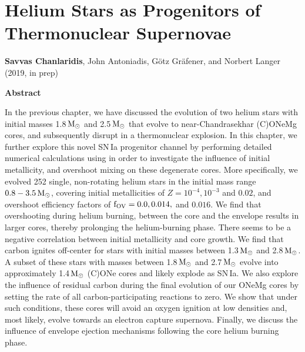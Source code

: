 \documentclass[../../main/thesis_msc.tex]{subfiles}
\begin{document}
\chapter{Helium Stars as Progenitors of Thermonuclear Supernovae}\label{ch:paperII}

\begin{center}
\textbf{Savvas Chanlaridis}, John Antoniadis, G\"otz Gr\"afener, and Norbert Langer (2019, in prep)
\newline
\end{center}


\begin{center}
\textbf{\large Abstract}
\end{center}

In the previous chapter, we have discussed the evolution of two helium stars with initial masses 1.8\,$\rm M_{\odot}$ and 2.5\,$\rm M_{\odot}$ that evolve to near-Chandrasekhar (C)ONeMg cores, and subsequently disrupt in a thermonuclear explosion. In this chapter, we further explore this novel SN\,Ia progenitor channel by performing detailed numerical calculations using \mesa in order to investigate the influence of initial metallicity, and overshoot mixing on these degenerate cores. 
More specifically, we evolved 252 single, non-rotating helium stars  in the initial mass range $\rm 0.8-3.5\, M_{\odot}$, covering initial metallicities of $Z=10^{-4},10^{-3}$ and $0.02$, and overshoot efficiency factors of $\rm f_{OV} = 0.0,0.014,$ and $0.016$. 
We find that overshooting during helium burning, between the core and the envelope results in larger cores, thereby prolonging the helium-burning phase. 
There seems to be a negative correlation between initial metallicity and core growth. We find that carbon ignites off-center for stars with initial masses between 1.3\,$\rm M_{\odot}$ and 2.8\,$\rm M_{\odot}$. A subset of these stars with masses between 1.8\,$\rm M_{\odot}$ and 2.7\,$\rm M_{\odot}$ evolve into approximately 1.4\,$\rm M_{\odot}$ (C)ONe cores and likely explode as SN\,Ia. 
We also explore the influence of residual carbon during the final evolution of our ONeMg cores by setting the rate of all carbon-participating reactions to zero. We  show that under such conditions,  these cores will avoid an oxygen ignition at low densities and, most likely, evolve towards an electron capture supernova. Finally, we discuss the influence of  envelope ejection mechanisms following the core helium burning phase.
\end{document}
